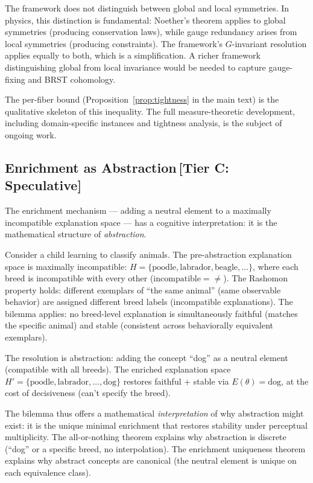 \documentclass[11pt,a4paper]{article}
\begin{document}
The framework does not distinguish between global and local symmetries.  In physics, this distinction is fundamental: Noether's theorem applies to global symmetries (producing conservation laws), while gauge redundancy arises from local symmetries (producing constraints).  The framework's $G$-invariant resolution applies equally to both, which is a simplification.  A richer framework distinguishing global from local invariance would be needed to capture gauge-fixing and BRST cohomology.



The per-fiber bound (Proposition~\ref{prop:tightness} in the main text) is the qualitative skeleton of this inequality. The full measure-theoretic development, including domain-specific instances and tightness analysis, is the subject of ongoing work.

\subsection{Enrichment as Abstraction\,\textnormal{\normalsize[Tier C: Speculative]}}
\label{sec:enrichment-abstraction}

The enrichment mechanism --- adding a neutral element to a maximally
incompatible explanation space --- has a cognitive interpretation: it is
the mathematical structure of \emph{abstraction}.

Consider a child learning to classify animals. The pre-abstraction
explanation space is maximally incompatible: $H = \{\text{poodle},
\text{labrador}, \text{beagle}, \ldots\}$, where each breed is
incompatible with every other ($\text{incompatible} = {\neq}$).  The
Rashomon property holds: different exemplars of ``the same animal''
(same observable behavior) are assigned different breed labels
(incompatible explanations).  The bilemma applies: no breed-level
explanation is simultaneously faithful (matches the specific animal) and
stable (consistent across behaviorally equivalent exemplars).

The resolution is abstraction: adding the concept ``dog'' as a neutral
element (compatible with all breeds).  The enriched explanation space
$H' = \{\text{poodle}, \text{labrador}, \ldots, \text{dog}\}$ restores
faithful + stable via $E(\theta) = \text{dog}$, at the cost of
decisiveness (can't specify the breed).

The bilemma thus offers a mathematical \emph{interpretation} of why
abstraction might exist: it is the unique minimal enrichment that
restores stability under perceptual multiplicity.  The all-or-nothing theorem
explains why abstraction is discrete (``dog'' or a specific breed, no
interpolation).  The enrichment uniqueness theorem explains why abstract
concepts are canonical (the neutral element is unique on each
equivalence class).
\end{document}
